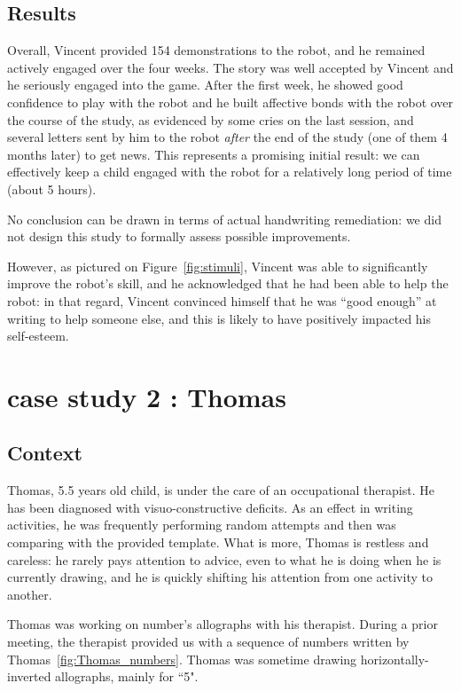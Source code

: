 \documentclass{sig-alternate}
\begin{document}
\subsection{Results}
Overall, Vincent provided 154 demonstrations to the robot, and he remained
actively engaged over the four weeks. The story was well accepted by Vincent and
he seriously engaged into the game. After the first week, he showed good
confidence to play with the robot and he built affective bonds with the robot
over the course of the study, as evidenced by some cries on the last session,
and several letters sent by him to the robot \emph{after} the end of the study
(one of them 4 months later) to get news. This represents a promising initial
result: we can effectively keep a child engaged with the robot for a relatively
long period of time (about 5 hours).

No conclusion can be drawn in terms of actual handwriting remediation: we did
not design this study to formally assess possible improvements.

However, as pictured on Figure~\ref{fig:stimuli}, Vincent was able to
significantly improve the robot's skill, and he acknowledged that he had been
able to help the robot: in that regard, Vincent convinced himself that he was
``good enough'' at writing to help someone else, and this is likely to have
positively impacted his self-esteem.



\section{case study 2 : Thomas}\label{Thomas}

\subsection{Context}

Thomas, 5.5 years old child, is under the care of an occupational
therapist. He has been diagnosed with visuo-constructive deficits.
As an effect in writing activities, he was frequently performing random attempts and then was comparing
with the provided template. What is more, Thomas is restless and careless: he
rarely pays attention to
advice, even to what he is doing when he is currently drawing, and he is
quickly shifting his attention from one activity to another.

Thomas was working on number's allographs with his therapist. During a prior
meeting, the therapist provided us with a sequence of numbers
written by Thomas~\ref{fig:Thomas_numbers}. Thomas was sometime drawing
horizontally-inverted allographs, mainly for ``5".
\end{document}
